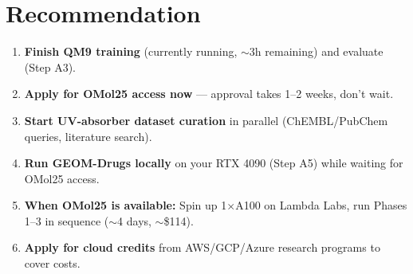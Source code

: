 \documentclass[11pt,a4paper]{article}
\begin{document}
\section{Recommendation}

\begin{enumerate}
    \item \textbf{Finish QM9 training} (currently running, $\sim$3h remaining)
          and evaluate (Step A3).
    \item \textbf{Apply for OMol25 access now} --- approval takes 1--2 weeks,
          don't wait.
    \item \textbf{Start UV-absorber dataset curation} in parallel (ChEMBL/PubChem
          queries, literature search).
    \item \textbf{Run GEOM-Drugs locally} on your RTX 4090 (Step A5) while
          waiting for OMol25 access.
    \item \textbf{When OMol25 is available:} Spin up 1$\times$A100 on Lambda Labs,
          run Phases 1--3 in sequence ($\sim$4 days, $\sim$\$114).
    \item \textbf{Apply for cloud credits} from AWS/GCP/Azure research programs
          to cover costs.
\end{enumerate}
\end{document}
